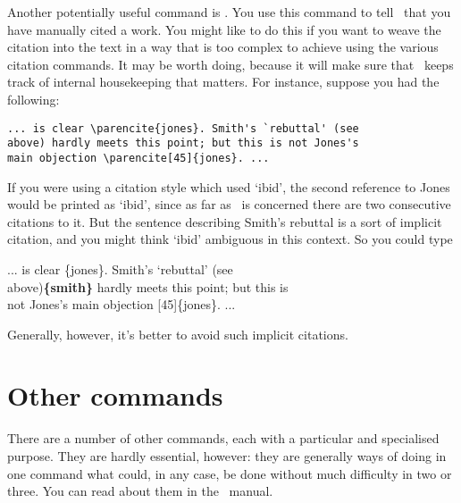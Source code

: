 Another potentially useful command is . You use this
command to tell \biblatex\ that you have manually cited a work. You
might like to do this if you want to weave the citation into the text
in a way that is too complex to achieve using the various citation
commands. It may be worth doing, because it will make sure that
\biblatex\ keeps track of internal housekeeping that matters. For
instance, suppose you had the following:
\begin{verbatim}
... is clear \parencite{jones}. Smith's `rebuttal' (see 
above) hardly meets this point; but this is not Jones's 
main objection \parencite[45]{jones}. ...
\end{verbatim}
If you were using a citation style which used `ibid', the second
reference to Jones would be printed as `ibid', since as far as
\biblatex\ is concerned there are two consecutive citations to it. But
the sentence describing Smith's rebuttal is a sort of implicit
citation, and you might think `ibid' ambiguous in this context. So you
could type
\begin{pseudoverb}
... is clear \{jones\}. Smith's `rebuttal' (see\\
above){\bfseries{}\{smith\}} hardly meets this point; but this is\\
not Jones's main objection [45]\{jones\}. ...
\end{pseudoverb}
Generally, however, it's better to avoid such implicit citations.

\section{Other commands}

There are a number of other commands, each with a particular and
specialised purpose. They are hardly essential, however: they are
generally ways of doing in one command what could, in any case, be
done without much difficulty in two or three. You can read about them
in the \biblatex\ manual.

